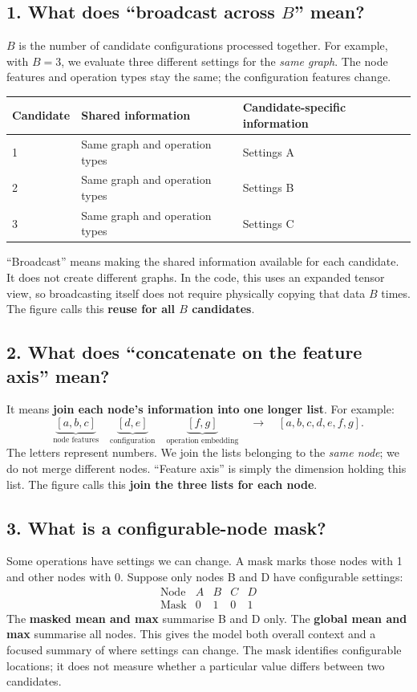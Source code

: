 \documentclass[11pt,a4paper]{article}
\begin{document}
\subsection*{1. What does ``broadcast across $B$'' mean?}
$B$ is the number of candidate configurations processed together. For example,
with $B=3$, we evaluate three different settings for the \emph{same graph}.
The node features and operation types stay the same; the configuration features change.
\begin{center}
\begin{tabular}{@{}lll@{}}
\toprule
\textbf{Candidate} & \textbf{Shared information} & \textbf{Candidate-specific information}\\\midrule
1 & Same graph and operation types & Settings A\\
2 & Same graph and operation types & Settings B\\
3 & Same graph and operation types & Settings C\\\bottomrule
\end{tabular}
\end{center}
``Broadcast'' means making the shared information available for each candidate.
It does not create different graphs. In the code, this uses an expanded tensor view,
so broadcasting itself does not require physically copying that data $B$ times.
The figure calls this \textbf{reuse for all $B$ candidates}.

\subsection*{2. What does ``concatenate on the feature axis'' mean?}
It means \textbf{join each node's information into one longer list}. For example:
\[
\underbrace{[a,b,c]}_{\text{node features}}\quad
\underbrace{[d,e]}_{\text{configuration}}\quad
\underbrace{[f,g]}_{\text{operation embedding}}
\quad\longrightarrow\quad[a,b,c,d,e,f,g].
\]
The letters represent numbers. We join the lists belonging to the \emph{same node};
we do not merge different nodes. ``Feature axis'' is simply the dimension holding
this list. The figure calls this \textbf{join the three lists for each node}.

\subsection*{3. What is a configurable-node mask?}
Some operations have settings we can change. A mask marks those nodes with 1 and
other nodes with 0. Suppose only nodes B and D have configurable settings:
\[
\begin{array}{c|cccc}
\text{Node} & A & B & C & D\\\hline
\text{Mask} & 0 & 1 & 0 & 1
\end{array}
\]
The \textbf{masked mean and max} summarise B and D only. The \textbf{global mean and max}
summarise all nodes. This gives the model both overall context and a focused summary
of where settings can change. The mask identifies configurable locations; it does
not measure whether a particular value differs between two candidates.
\end{document}
